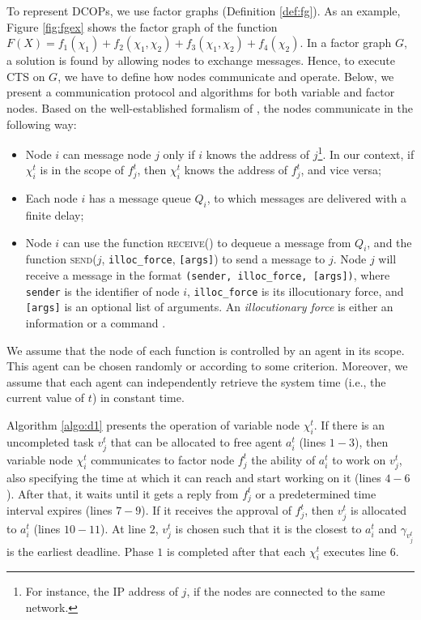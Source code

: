 To represent DCOPs, we use factor graphs (Definition \ref{def:fg}). As an example, Figure
\ref{fig:fgex} shows the factor graph of the function $F(X) = f_1(\chi_1) + f_2(\chi_1,
\chi_2) + f_3(\chi_1, \chi_2) + f_4(\chi_2)$. In a factor graph $G$, a solution is found
by allowing nodes to exchange messages. Hence, to execute CTS on $G$, we have to define
how nodes communicate and operate. Below, we present a communication protocol and
algorithms for both variable and factor nodes. Based on the well-established formalism of
\cite{yokoo1992}, the nodes communicate in the following way:
\begin{itemize}
    \item Node $i$ can message node $j$ only if $i$ knows the address of $j$\footnote{For
        instance, the IP address of $j$, if the nodes are connected to the same network.}.
        In our context, if $\chi_i^t$ is in the scope of $f_j^t$, then $\chi_i^t$ knows
        the address of $f_j^t$, and vice versa;
    \item Each node $i$ has a message queue $Q_i$, to which messages are delivered with a
        finite delay;
    \item Node $i$ can use the function \textsc{receive}() to dequeue a message from
        $Q_i$, and the function \textsc{send}($j$, \texttt{illoc\_force}, \texttt{[args]})
        to send a message to $j$. Node $j$ will receive a message in the format
        \texttt{(sender, illoc\_force, [args])}, where \texttt{sender} is the identifier
        of node $i$, \texttt{illoc\_force} is its illocutionary force, and \texttt{[args]}
        is an optional list of arguments. An \emph{illocutionary force} is either an
        information or a command \cite{vieira2007}.
\end{itemize}
We assume that the node of each function is controlled by an agent in its
scope\label{fgas}. This agent can be chosen randomly or according to some criterion.
Moreover, we assume that each agent can independently retrieve the system time (i.e., the
current value of $t$) in constant time.

Algorithm \ref{algo:d1} presents the operation of variable node $\chi_i^t$. If there is
an uncompleted task $v_j^t$ that can be allocated to free agent $a_i^t$ (lines $1 - 3$),
then variable node $\chi_i^t$ communicates to factor node $f_j^t$ the ability of $a_i^t$
to work on $v_j^t$, also specifying the time at which it can reach and start working on it
(lines $4 - 6$). After that, it waits until it gets a reply from $f_j^t$ or a
predetermined time interval expires (lines $7 - 9$). If it receives the approval of
$f_j^t$, then $v_j^t$ is allocated to $a_i^t$ (lines $10 - 11$). At line $2$, $v_j^t$ is
chosen such that it is the closest to $a_i^t$ and $\gamma_{v_j^t}$ is the earliest
deadline. Phase $1$ is completed after that each $\chi_i^t$ executes line $6$.


